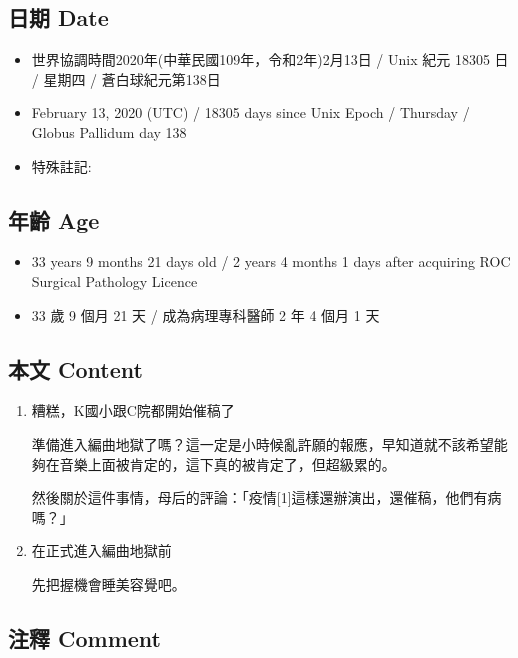 \documentclass[a5paper, 12pt
]{book}
\providecommand{\tightlist}{%
  \setlength{\itemsep}{0pt}\setlength{\parskip}{0pt}}
\begin{document}
\hypertarget{ux65e5ux671f-date-74}{%
\subsection{日期 Date}\label{ux65e5ux671f-date-74}}

\begin{itemize}
\tightlist
\item
  世界協調時間2020年(中華民國109年，令和2年)2月13日 / Unix 紀元 18305 日
  / 星期四 / 蒼白球紀元第138日
\item
  February 13, 2020 (UTC) / 18305 days since Unix Epoch / Thursday /
  Globus Pallidum day 138
\item
  特殊註記:
\end{itemize}

\hypertarget{ux5e74ux9f61-age-74}{%
\subsection{年齡 Age}\label{ux5e74ux9f61-age-74}}

\begin{itemize}
\tightlist
\item
  33 years 9 months 21 days old / 2 years 4 months 1 days after
  acquiring ROC Surgical Pathology Licence
\item
  33 歲 9 個月 21 天 / 成為病理專科醫師 2 年 4 個月 1 天
\end{itemize}

\hypertarget{ux672cux6587-content-74}{%
\subsection{本文 Content}\label{ux672cux6587-content-74}}

\begin{enumerate}
\def\labelenumi{\arabic{enumi}.}
\item
  糟糕，K國小跟C院都開始催稿了

  準備進入編曲地獄了嗎？這一定是小時候亂許願的報應，早知道就不該希望能夠在音樂上面被肯定的，這下真的被肯定了，但超級累的。

  然後關於這件事情，母后的評論：「疫情{[}1{]}這樣還辦演出，還催稿，他們有病嗎？」
\item
  在正式進入編曲地獄前

  先把握機會睡美容覺吧。
\end{enumerate}

\hypertarget{ux6ce8ux91cb-comment-73}{%
\subsection{注釋 Comment}\label{ux6ce8ux91cb-comment-73}}
\end{document}
